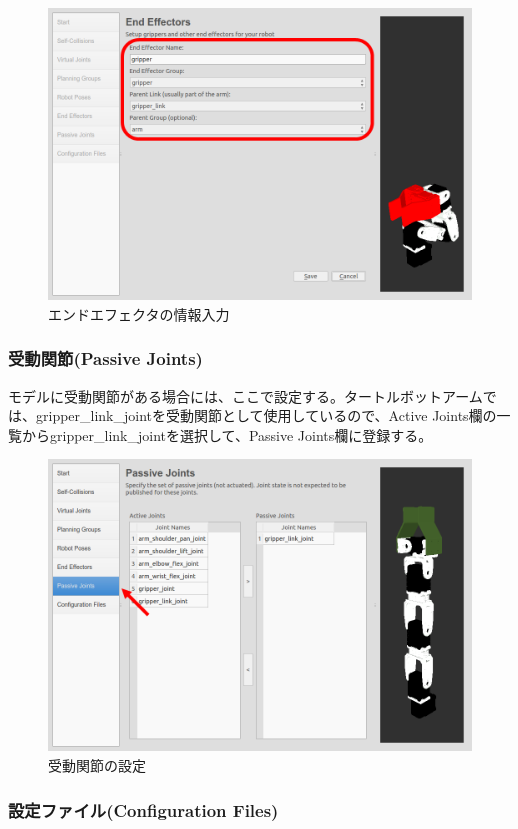 \begin{figure}[htp]
  \centering
  \includegraphics[width=12cm]{pictures/chapter11/pic_11_30.png}
  \caption{エンドエフェクタの情報入力}
\end{figure}

\subsubsection{受動関節(Passive Joints)}

モデルに受動関節がある場合には、ここで設定する。タートルボットアームでは、gripper\_link\_jointを受動関節として使用しているので、Active Joints欄の一覧からgripper\_link\_jointを選択して、Passive Joints欄に登録する。

\begin{figure}[htp]
  \centering
  \includegraphics[width=12cm]{pictures/chapter11/pic_11_31.png}
  \caption{受動関節の設定}
\end{figure}

\subsubsection{設定ファイル(Configuration Files)}

